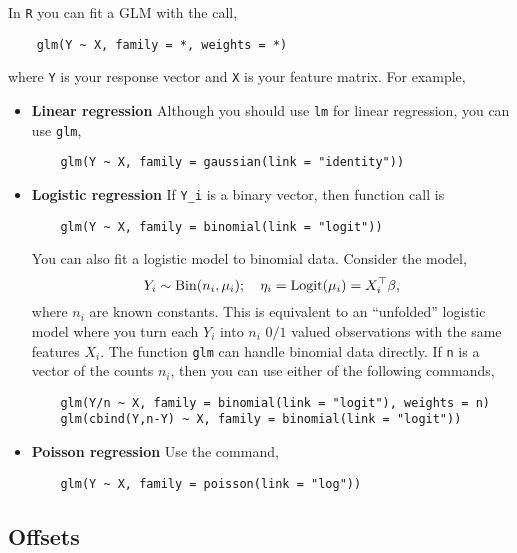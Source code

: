 In \verb|R| you can fit a GLM with the call,
\begin{verbatim}
    glm(Y ~ X, family = *, weights = *)
\end{verbatim}
where \verb|Y| is your response vector and \verb|X| is your feature matrix. For example,
\begin{itemize}
    \item {\bf Linear regression} Although you should use \verb|lm| for linear regression, you can use \verb|glm|,
\begin{verbatim} 
    glm(Y ~ X, family = gaussian(link = "identity")) 
\end{verbatim}
    \item {\bf Logistic regression} If \verb|Y_i| is a binary vector, then function call is
\begin{verbatim} 
    glm(Y ~ X, family = binomial(link = "logit")) 
\end{verbatim}
    You can also fit a logistic model to binomial data. Consider the model,
    \[Y_i \sim \mathrm{Bin}(n_i, \mu_i); \quad \eta_i = \mathrm{Logit}(\mu_i) = X_i^\top \beta, \]
    where $n_i$ are known constants. This is equivalent to an ``unfolded'' logistic model where you turn each $Y_i$ into $n_i$ $0/1$ valued observations with the same features $X_i$. The function \verb|glm| can handle binomial data directly. If \verb|n| is a vector of the counts $n_i$, then you can use either of the following commands,
\begin{verbatim}
    glm(Y/n ~ X, family = binomial(link = "logit"), weights = n)
    glm(cbind(Y,n-Y) ~ X, family = binomial(link = "logit"))
\end{verbatim}
\item {\bf Poisson regression} Use the command,
\begin{verbatim}
    glm(Y ~ X, family = poisson(link = "log"))
\end{verbatim}
\end{itemize}

\subsection{Offsets}

